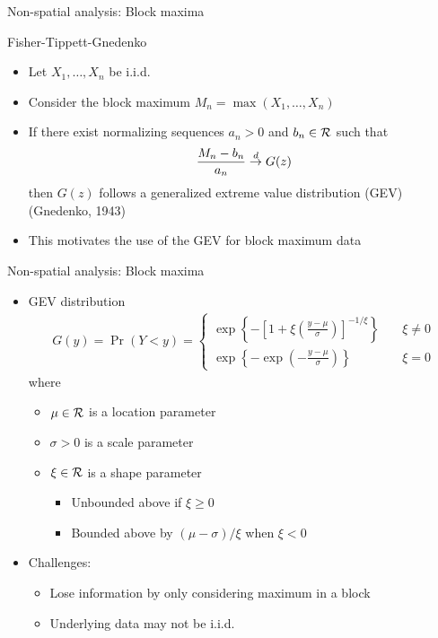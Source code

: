 \documentclass{beamer}
\begin{document}
\begin{frame}{Non-spatial analysis: Block maxima}
\begin{adjustwidth}{1em}{0em}
  Fisher-Tippett-Gnedenko \vspace{1em}
  \begin{itemize} \setlength{\itemsep}{1em}
    \item Let $X_1, \ldots, X_n$ be i.i.d.
    \item Consider the block maximum $M_n = \max(X_1, \ldots, X_n)$
    \item If there exist normalizing sequences $a_n > 0$ and $b_n \in {\cal R}$ such that
    \begin{align*}
      \frac{ M_n - b_n }{ a_n } \stackrel{d}{\rightarrow} G(z)
    \end{align*}
    then $G(z)$ follows a generalized extreme value distribution (GEV) (Gnedenko, 1943)
    \item This motivates the use of the GEV for block maximum data
  \end{itemize}
\end{adjustwidth}
\end{frame}

\begin{frame}{Non-spatial analysis: Block maxima}
  \begin{itemize} \setlength{\itemsep}{1em}
    \item GEV distribution
    \begin{align*}
      G(y) = \Pr(Y < y) = \left\{  \begin{array}{ll}
        \exp\left\{ -\left[ 1 + \xi \left( \frac{ y - \mu }{ \sigma } \right) \right]^{ -1 / \xi} \right\} & \quad \xi \neq 0 \\[0.5em]
        \exp \left\{ -\exp \left( - \frac{ y - \mu }{ \sigma} \right) \right\} & \quad \xi = 0
      \end{array}\right.
    \end{align*}
    where
    \begin{itemize} \setlength{\itemsep}{0.25em}
      \item $\mu \in {\cal R}$ is a location parameter
      \item $\sigma > 0$ is a scale parameter
      \item $\xi \in {\cal R}$ is a shape parameter
      \begin{itemize}
        \item Unbounded above if $\xi \ge 0$
        \item Bounded above by $(\mu - \sigma) / \xi$ when $\xi < 0$
      \end{itemize}
    \end{itemize}
    \item Challenges:
    \begin{itemize}
      \item Lose information by only considering maximum in a block
      \item Underlying data may not be i.i.d.
    \end{itemize}
  \end{itemize}
\end{frame}
\end{document}
